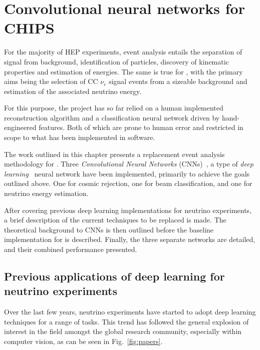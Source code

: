 \chapter{Convolutional neural networks for CHIPS} %
\label{chap:cvn} %

For the majority of HEP experiments, event analysis entails the separation of signal from
background, identification of particles, discovery of kinematic properties and estimation of
energies. The same is true for \chips, with the primary aims being the selection of CC $\nu_{e}$
signal events from a sizeable background and estimation of the associated neutrino energy.

For this purpose, the \chips project has so far relied on a human implemented reconstruction
algorithm and a classification neural network driven by hand-engineered features. Both of which
are prone to human error and restricted in scope to what has been implemented in software.

The work outlined in this chapter presents a replacement event analysis methodology for \chips.
Three \emph{Convolutional Neural Networks} (CNNs)~\cite{fukushima1982}, a type of \emph{deep
    learning}~\cite{goodfellow2016} neural network have been implemented, primarily to achieve the
goals outlined above. One for cosmic rejection, one for beam classification, and one for neutrino
energy estimation.

After covering previous deep learning implementations for neutrino experiments, a brief
description of the current techniques to be replaced is made. The theoretical background to CNNs
is then outlined before the baseline implementation for \chips is described. Finally, the three
separate networks are detailed, and their combined performance presented.

\section{Previous applications of deep learning for neutrino experiments} %
\label{sec:cvn_previous} %

Over the last few years, neutrino experiments have started to adopt deep learning techniques for a
range of tasks. This trend has followed the general explosion of interest in the field amongst the
global research community, especially within computer vision, as can be seen in
Fig.~\ref{fig:papers}.

